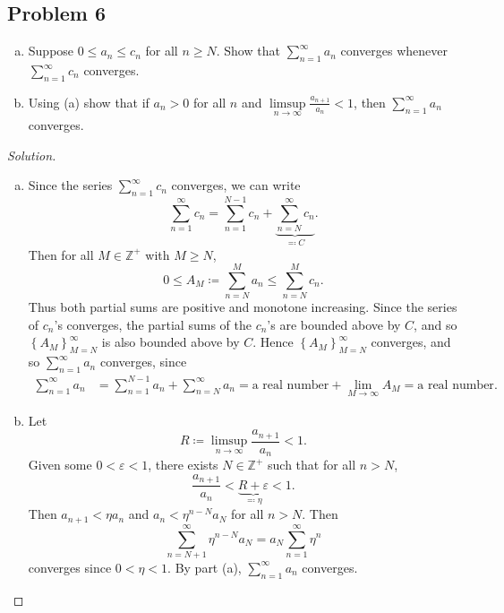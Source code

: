 \documentclass[12pt]{article}
\newcommand{\z}{\mathbb{Z}}
\newcommand\setb[1]{\left \{ #1 \right \}}
\newcommand{\eps}{\varepsilon}
\theoremstyle{definition}
\begin{document}
\subsection{Problem 6}
\begin{enumerate}[(a)]
    \item Suppose $0 \leq a_n \leq c_n$ for all $n \geq N$. Show that $\displaystyle \sum\limits_{n = 1}^{\infty} a_n$ converges whenever $\displaystyle \sum\limits_{n = 1}^{\infty} c_n$ converges.
    \item Using (a) show that if $a_n > 0$ for all $n$ and $\displaystyle \limsup\limits_{n \to \infty} \frac{a_{n+1}}{a_n} < 1$, then $\displaystyle \sum\limits_{n = 1}^{\infty} a_n$ converges.
\end{enumerate}
\begin{proof}[Solution]
    \noindent 
    \begin{enumerate}[(a)]
        \item Since the series $\sum\limits_{n = 1}^{\infty} c_n$ converges, we can write 
        \[
            \sum\limits_{n = 1}^{\infty} c_n = \sum\limits_{n = 1}^{N-1} c_n + \underbrace{ \sum\limits_{n = N}^{\infty} c_n }_{ \eqqcolon C }.
        \]
        Then for all $M \in \z^+$ with $M \geq N$, 
        \[
            0 \leq A_M \coloneqq \sum\limits_{n = N}^M a_n \leq \sum\limits_{n = N}^M c_n.
        \]
        Thus both partial sums are positive and monotone increasing. Since the series of $c_n$'s converges, the partial sums of the $c_n$'s are bounded above by $C$, and so $\setb{ A_M }_{M=N}^{\infty}$ is also bounded above by $C$. Hence $\setb{ A_M }_{M=N}^{\infty}$ converges, and so $\sum\limits_{n = 1}^{\infty} a_n$ converges, since
        \begin{align*}
            \sum\limits_{n = 1}^{\infty} a_n & = \sum\limits_{n = 1}^{N-1} a_n + \sum\limits_{n = N}^{\infty} a_n = \text{a real number} + \lim\limits_{M \to \infty} A_M = \text{a real number}.
        \end{align*}
        \item Let 
        \[
            R \coloneqq \limsup\limits_{n \to \infty} \frac{a_{n+1}}{a_n} < 1.
        \]  
        Given some $0 < \eps < 1$, there exists $N \in \z^+$ such that for all $n > N$, 
        \[
            \frac{a_{n+1}}{a_n} < \underbrace{ R + \eps }_{ \eqqcolon \eta } < 1.
        \]
        Then $a_{n+1} < \eta a_n$ and $a_n < \eta^{n - N} a_N$ for all $n > N$. Then
        \[
            \sum\limits_{n = N + 1}^{\infty} \eta^{n - N} a_N = a_N \sum\limits_{n = 1}^{\infty} \eta^n 
        \]  
        converges since $0 < \eta < 1$. By part (a), $\sum\limits_{n = 1}^{\infty} a_n$ converges.
    \end{enumerate}
\end{proof}
\end{document}
